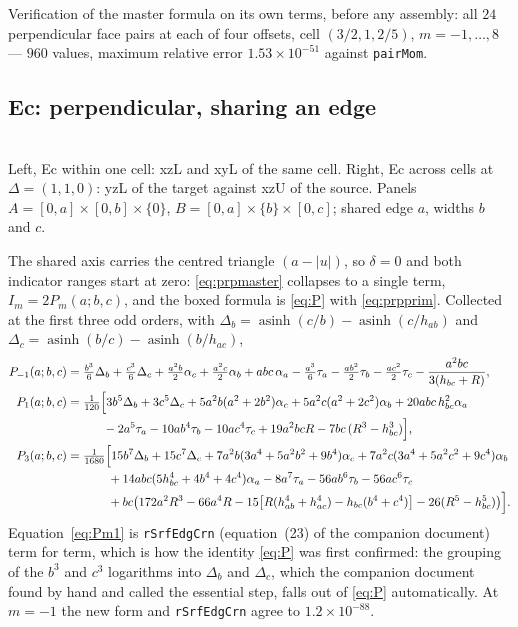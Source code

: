 \documentclass[11pt]{article}
\theoremstyle{remark}
\newcommand{\asinh}{\operatorname{asinh}}
\newcommand{\code}[1]{\texttt{#1}}
\newcommand{\geofig}[2]{\begin{center}#1\\[2pt]{\footnotesize #2}\end{center}}
\begin{document}
Verification of the master formula on its own terms, before any assembly: all $24$
perpendicular face pairs at each of four offsets, cell $(3/2, 1, 2/5)$, $m = -1,\ldots,8$
--- $960$ values, maximum relative error $1.53\times10^{-51}$ against \code{pairMom}.

\subsection{Ec: perpendicular, sharing an edge}
\label{sec:Ec}

\geofig{\figEc\qquad\figEcx}{Left, Ec within one cell: xzL and xyL of the same cell. Right,
Ec across cells at $\Delta = (1,1,0)$: yzL of the target against xzU of the source. Panels
$A = [0,a]\times[0,b]\times\{0\}$, $B = [0,a]\times\{b\}\times[0,c]$; shared edge $a$,
widths $b$ and $c$.}

The shared axis carries the centred triangle $(a-|u|)$, so
$\delta = 0$ and both indicator ranges start at zero: \eqref{eq:prpmaster} collapses to a
single term, $I_m = 2P_m(a;b,c)$, and the boxed formula is \eqref{eq:P} with
\eqref{eq:prpprim}. Collected at the first three odd orders, with
$\Delta_b = \asinh(c/b) - \asinh(c/h_{ab})$ and
$\Delta_c = \asinh(b/c) - \asinh(b/h_{ac})$,
{\small
\begin{align}
P_{-1}(a;b,c) &= \tfrac{b^3}{6}\Delta_b + \tfrac{c^3}{6}\Delta_c
 + \tfrac{a^2b}{2}\alpha_c + \tfrac{a^2c}{2}\alpha_b + abc\,\alpha_a
 - \tfrac{a^3}{6}\tau_a - \tfrac{ab^2}{2}\tau_b - \tfrac{ac^2}{2}\tau_c
 - \frac{a^2bc}{3(h_{bc}+R)},
\label{eq:Pm1}\\
P_{1}(a;b,c) &= \tfrac{1}{120}\Bigl[3b^5\Delta_b + 3c^5\Delta_c
 + 5a^2b(a^2+2b^2)\alpha_c + 5a^2c(a^2+2c^2)\alpha_b + 20abc\,h_{bc}^2\alpha_a\notag\\
&\hphantom{= \tfrac{1}{120}\Bigl[}
 - 2a^5\tau_a - 10ab^4\tau_b - 10ac^4\tau_c + 19a^2bcR - 7bc\,(R^3 - h_{bc}^3)\Bigr],\\
P_{3}(a;b,c) &= \tfrac{1}{1680}\Bigl[15b^7\Delta_b + 15c^7\Delta_c
 + 7a^2b(3a^4+5a^2b^2+9b^4)\alpha_c + 7a^2c(3a^4+5a^2c^2+9c^4)\alpha_b\notag\\
&\hphantom{= \tfrac{1}{1680}\Bigl[}
 + 14abc(5h_{bc}^4 + 4b^4 + 4c^4)\alpha_a - 8a^7\tau_a - 56ab^6\tau_b - 56ac^6\tau_c\notag\\
&\hphantom{= \tfrac{1}{1680}\Bigl[}
 + bc\bigl(172a^2R^3 - 66a^4R - 15\bigl[R(h_{ab}^4+h_{ac}^4) - h_{bc}(b^4+c^4)\bigr] - 26(R^5 - h_{bc}^5)\bigr)\Bigr].
\end{align}}%
Equation~\eqref{eq:Pm1} is \code{rSrfEdgCrn} (equation~(23) of the companion document)
term for term, which is how the identity \eqref{eq:P} was first confirmed: the grouping of
the $b^3$ and $c^3$ logarithms into $\Delta_b$ and $\Delta_c$, which the companion document
found by hand and called the essential step, falls out of \eqref{eq:P} automatically. At
$m = -1$ the new form and \code{rSrfEdgCrn} agree to $1.2\times10^{-88}$.
\end{document}
